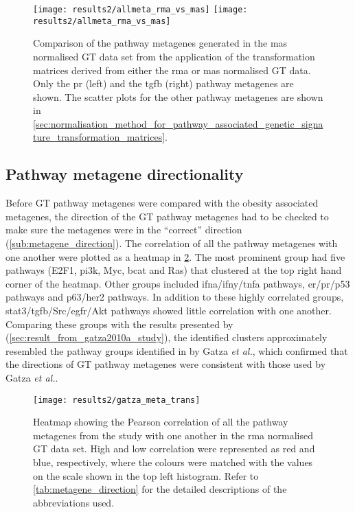 \begin{figure}[htpb]
	\centering
	\texttt{[image: results2/allmeta\_rma\_vs\_mas]}
	\texttt{[image: results2/allmeta\_rma\_vs\_mas]}
	\caption[Comparison of the pathway metagenes generated in the \acrshort{mas} normalised GT data set from the application of the transformation matrices derived from either the \acrshort{rma} or \acrshort{mas} normalised GT data]{Comparison of the pathway metagenes generated in the \acrshort{mas} normalised GT data set from the application of the transformation matrices derived from either the \acrshort{rma} or \acrshort{mas} normalised GT data.
	Only the \gls{pr} (left) and the \gls{tgfb}  (right) pathway metagenes are shown.
	The scatter plots for the other pathway metagenes are shown in \cref{sec:normalisation_method_for_pathway_associated_genetic_signature_transformation_matrices}.
	}
	\label{fig:gt_rma_vs_mas}
\end{figure}

\subsection{Pathway metagene directionality}
\label{sub:pathway_metagene_directionality}

Before GT pathway metagenes were compared with the obesity associated metagenes, the direction of the GT pathway metagenes had to be checked to make sure the metagenes were in the ``correct'' direction (\cref{sub:metagene_direction}).
The correlation of all the pathway metagenes with one another were plotted as a heatmap in \cref{fig:gatza_meta_dir}.
The most prominent group had five pathways (E2F1, \gls{pi3k}, Myc, \gls{bcat} and Ras) that clustered at the top right hand corner of the heatmap.
Other groups included \gls{ifna}/\gls{ifny}/\gls{tnfa} pathways, \gls{er}/\gls{pr}/p53 pathways and p63/\gls{her2} pathways.
In addition to these highly correlated groups, \gls{stat3}/\gls{tgfb}/Src/\gls{egfr}/Akt pathways showed little correlation with one another.
Comparing these groups with the results presented by \citet{Gatza2010a} (\cref{sec:result_from_gatza2010a_study}), the identified clusters approximately resembled the pathway groups identified in by Gatza \textit{et al.}, which confirmed that the directions of GT pathway metagenes were consistent with those used by Gatza \textit{et al.}.

\begin{figure}[htpb]
	\centering
	\texttt{[image: results2/gatza\_meta\_trans]}
	\caption[Heatmap of the Pearson correlation of all the pathway metagenes with one another in the \acrshort{rma} normalised GT data]{Heatmap showing the Pearson correlation of all the pathway metagenes from the \citet{Gatza2010a} study with one another  in the \gls{rma} normalised GT data set.
		High and low correlation were represented as red and blue, respectively, where the colours were matched with the values on the scale shown in the top left histogram.
		Refer to \cref{tab:metagene_direction} for the detailed descriptions of the abbreviations used.
		}
	\label{fig:gatza_meta_dir}
\end{figure}

